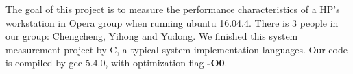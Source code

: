
The goal of this project is to measure the performance characteristics of a HP's workstation in Opera group when running ubuntu 16.04.4. There is 3 people in our group: Chengcheng, Yihong and Yudong. We finished this system measurement project by C, a typical system implementation languages. Our code is compiled by gcc 5.4.0, with optimization flag \textbf{-O0}. 
